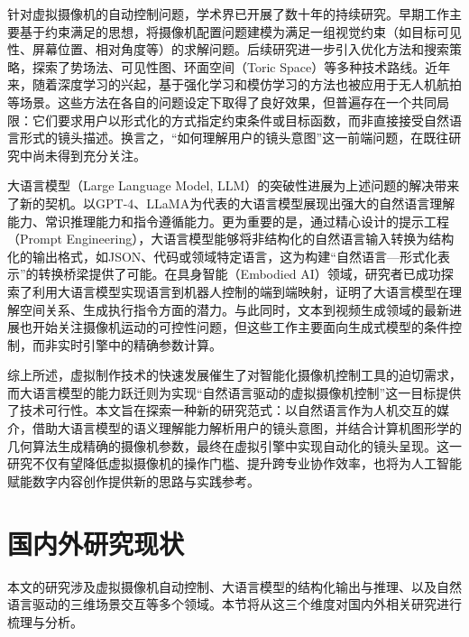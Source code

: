 针对虚拟摄像机的自动控制问题，学术界已开展了数十年的持续研究。早期工作主要基于约束满足的思想，将摄像机配置问题建模为满足一组视觉约束（如目标可见性、屏幕位置、相对角度等）的求解问题\cite{gleicher1992through,bares1999constraint}。后续研究进一步引入优化方法和搜索策略，探索了势场法\cite{li2008real}、可见性图\cite{oskam2009visibility}、环面空间（Toric Space）\cite{lino2015intuitive}等多种技术路线。近年来，随着深度学习的兴起，基于强化学习和模仿学习的方法也被应用于无人机航拍等场景\cite{bonatti2020autonomous,nageli2017real}。这些方法在各自的问题设定下取得了良好效果，但普遍存在一个共同局限：它们要求用户以形式化的方式指定约束条件或目标函数，而非直接接受自然语言形式的镜头描述。换言之，“如何理解用户的镜头意图”这一前端问题，在既往研究中尚未得到充分关注。

大语言模型（Large Language Model, LLM）的突破性进展为上述问题的解决带来了新的契机。以GPT-4\cite{openai2023gpt4}、LLaMA\cite{touvron2023llama2}为代表的大语言模型展现出强大的自然语言理解能力、常识推理能力和指令遵循能力\cite{ouyang2022training,wei2022chain}。更为重要的是，通过精心设计的提示工程（Prompt Engineering）\cite{sahoo2024systematic}，大语言模型能够将非结构化的自然语言输入转换为结构化的输出格式，如JSON、代码或领域特定语言，这为构建“自然语言—形式化表示”的转换桥梁提供了可能。在具身智能（Embodied AI）领域，研究者已成功探索了利用大语言模型实现语言到机器人控制的端到端映射\cite{liang2023code,driess2023palme,huang2023voxposer}，证明了大语言模型在理解空间关系、生成执行指令方面的潜力。与此同时，文本到视频生成领域的最新进展也开始关注摄像机运动的可控性问题\cite{wang2024motionctrl,he2024cameractrl}，但这些工作主要面向生成式模型的条件控制，而非实时引擎中的精确参数计算。

综上所述，虚拟制作技术的快速发展催生了对智能化摄像机控制工具的迫切需求，而大语言模型的能力跃迁则为实现“自然语言驱动的虚拟摄像机控制”这一目标提供了技术可行性。本文旨在探索一种新的研究范式：以自然语言作为人机交互的媒介，借助大语言模型的语义理解能力解析用户的镜头意图，并结合计算机图形学的几何算法生成精确的摄像机参数，最终在虚拟引擎中实现自动化的镜头呈现。这一研究不仅有望降低虚拟摄像机的操作门槛、提升跨专业协作效率，也将为人工智能赋能数字内容创作提供新的思路与实践参考。

\section{国内外研究现状}

本文的研究涉及虚拟摄像机自动控制、大语言模型的结构化输出与推理、以及自然语言驱动的三维场景交互等多个领域。本节将从这三个维度对国内外相关研究进行梳理与分析。


